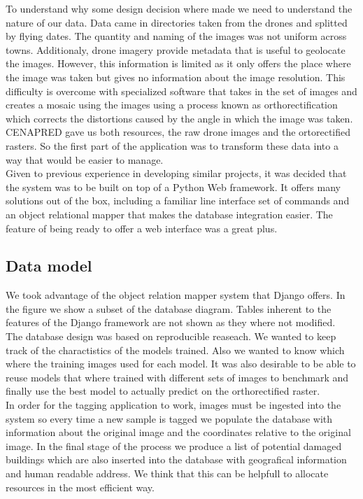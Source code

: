 To understand why some design decision where made we need to understand the nature of our data. Data came in directories taken from the drones and splitted by flying dates. The quantity and naming of the images was not uniform across towns. Additionaly, drone imagery provide metadata that is useful to geolocate the images. However, this information is limited as it only offers the place where the image was taken but gives no information about the image resolution. This difficulty is overcome with specialized software that takes in the set of images and creates a mosaic using the images using a process known as orthorectification which corrects the distortions caused by the angle in which the image was taken. CENAPRED gave us both resources, the raw drone images and the ortorectified rasters. So the first part of the application was to transform these data into a way that would be easier to manage.\\

Given to previous experience in developing similar projects, it was decided that the system was to be built on top of a Python Web framework. It offers many solutions out of the box, including a familiar line interface set of commands and an object relational mapper that makes the database integration easier. The feature of being ready to offer a web interface was a great plus.\\

\subsection{Data model}

We took advantage of the object relation mapper system that Django offers. In the figure \cite{fig:database} we show a subset of the database diagram. Tables inherent to the features of the Django framework are not shown as they where not modified.\\

The database design was based on reproducible reaseach. We wanted to keep track of the charactistics of the models trained. Also we wanted to know which where the training images used for each model. It was also desirable to be able to reuse models that where trained with different sets of images to benchmark and finally use the best model to actually predict on the orthorectified raster.\\


In order for the tagging application to work, images must be ingested into the system so every time a new sample is tagged we populate the database with information about the original image and the coordinates relative to the original image. In the final stage of the process we produce a list of potential damaged buildings which are also inserted into the database with geografical information and human readable address. We think that this can be helpfull to allocate resources in the most efficient way.\\

